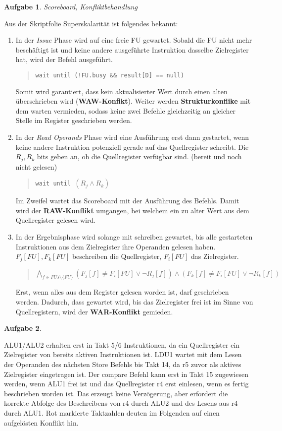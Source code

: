 \documentclass[a4paper,12pt,headsepline]{scrartcl}
\newtheorem{aufgabe}{Aufgabe}
\begin{document}
\begin{aufgabe}Scoreboard, Konfliktbehandlung
\end{aufgabe}
Aus der Skriptfolie Superskalarität ist folgendes bekannt:
\begin{enumerate}
    \item In der \textit{Issue} Phase wird auf eine freie FU gewartet. Sobald die FU nicht mehr beschäftigt ist und keine andere ausgeführte Instruktion dasselbe Zielregister hat, wird der Befehl ausgeführt. 
    \begin{quotation}
    \texttt{wait until (!FU.busy \&\& result[D] == null)}
    \end{quotation}
    Somit wird garantiert, dass kein aktualisierter Wert durch einen alten überschrieben wird (\textbf{WAW-Konfikt}). Weiter werden \textbf{Strukturkonflike} mit dem warten vermieden, sodass keine zwei Befehle gleichzeitig an gleicher Stelle im Register geschrieben werden.
    \item In der \textit{Read Operands} Phase wird eine Ausführung erst dann gestartet, wenn keine andere Instruktion potenziell gerade auf das Quellregister schreibt. Die $R_j,  R_k$ bits geben an, ob die Quellregister verfügbar sind. (bereit und noch nicht gelesen)
    \begin{quotation}
    \texttt{wait until $ (R_j \wedge R_k) $}
    \end{quotation}
    Im Zweifel wartet das Scoreboard mit der Ausführung des Befehls. Damit wird der \textbf{RAW-Konflikt} umgangen, bei welchem ein zu alter Wert aus dem Quellregister gelesen wird.
    \item In der Ergebnisphase wird solange mit schreiben gewartet, bis alle gestarteten Instruktionen aus dem Zielregister ihre Operanden gelesen haben. $F_j[FU],F_k[FU]$ beschreiben die Quellregister, $F_i[FU]$ das Zielregister.
    \begin{quotation}
    \texttt{$\bigwedge_{f\in FUs\setminus\{FU\}}(F_j[f] \neq F_i[FU] \vee \neg R_j[f])\wedge (F_k[f] \neq F_i[FU] \vee \neg R_k[f])$}
    \end{quotation}
    Erst, wenn alles aus dem Register gelesen worden ist, darf geschrieben werden. Dadurch, dass gewartet wird, bis das Zielregister frei ist im Sinne von Quellregistern, wird der \textbf{WAR-Konflikt} gemieden.
\end{enumerate}

\begin{aufgabe}
\end{aufgabe}
ALU1/ALU2 erhalten erst in Takt 5/6 Instruktionen, da ein Quellregister ein Zielregister von bereits aktiven Instruktionen ist. LDU1 wartet mit dem Lesen der Operanden des nächsten Store Befehls bis Takt 14, da r5 zuvor als aktives Zielregister eingetragen ist. Der compare Befehl kann erst in Takt 15 zugewiesen werden, wenn ALU1 frei ist und das Quellregister r4 erst einlesen, wenn es fertig beschrieben worden ist. Das erzeugt keine Verzögerung, aber erfordert die korrekte Abfolge des Beschreibens von r4 durch ALU2 und des Lesens aus r4 durch ALU1. Rot markierte Taktzahlen deuten im Folgenden auf einen aufgelösten Konflikt hin.\\
\end{document}
